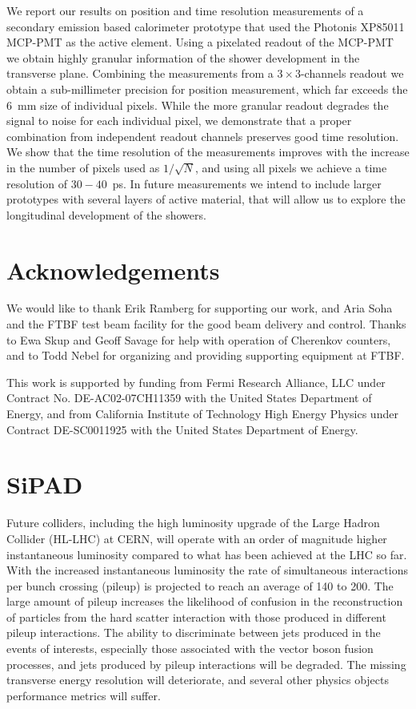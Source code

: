 We report our results on position and time resolution measurements of a
secondary emission based calorimeter prototype that used the Photonis XP85011
MCP-PMT as the active element. Using a pixelated readout of the MCP-PMT we
obtain highly granular information of the shower development in the
transverse plane. Combining the measurements from a $3\times3$-channels readout
we obtain a sub-millimeter precision for position measurement, which far exceeds
the 6~mm size of individual pixels. While the more granular readout degrades
the signal to noise for each individual pixel, we demonstrate that a proper combination from 
independent readout channels preserves good time resolution. We show that the time resolution 
of the measurements improves with the increase in the number of pixels used as 
$1/\sqrt{N}$, and using all pixels we achieve a time resolution of $30-40$~ps. 
In future measurements we intend to include larger prototypes with several layers of active
material, that will allow us to explore the longitudinal development of the
showers.

\section{Acknowledgements} We would like to thank Erik Ramberg for supporting 
our work, and Aria Soha and the FTBF test beam facility for the good beam
delivery and control. Thanks to Ewa Skup and Geoff Savage for help with
operation of Cherenkov counters, and to Todd Nebel for organizing and providing
supporting equipment at FTBF. 

This work is supported by funding from Fermi Research Alliance, LLC under
Contract No. DE-AC02-07CH11359 with the United States Department of Energy, and
from California Institute of Technology High Energy Physics under Contract
DE-SC0011925 with the United States Department of Energy.

\clearpage
\section{SiPAD}
Future colliders, including the high luminosity upgrade of the Large Hadron
Collider (HL-LHC) at CERN, will operate with an order of magnitude higher
instantaneous luminosity compared to what has been achieved at the LHC so far.
With the increased instantaneous luminosity the rate of simultaneous
interactions per bunch crossing (pileup) is projected to reach an average of 140
to 200. The large amount of pileup increases the likelihood of confusion in the
reconstruction of particles from the hard scatter interaction with those
produced in different pileup interactions. The ability to discriminate between
jets produced in the events of interests, especially those associated with the
vector boson fusion processes, and jets produced by pileup interactions will be
degraded. The missing transverse energy resolution will deteriorate, and several
other physics objects performance metrics will suffer.

